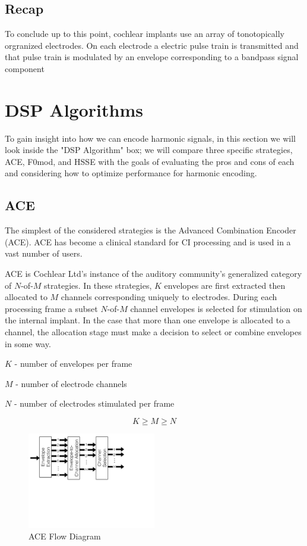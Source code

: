 \documentclass [11pt, proquest,oneside] {ganter_thesis}[2015/03/03]
\begin{document}
\subsection{Recap}

To conclude up to this point, cochlear implants use an array of tonotopically orgranized electrodes.  On each electrode a electric pulse train is transmitted and that pulse train is modulated by an envelope corresponding to a bandpass signal component

\section{DSP Algorithms}

To gain insight into how we can encode harmonic signals, in this section we will look inside the "DSP Algorithm" box; we will compare three specific strategies, ACE, F0mod, and HSSE with the goals of evaluating the pros and cons of each and considering how to optimize performance for harmonic encoding.

\subsection{ACE}\label{ss:ACE}

The simplest of the considered strategies is the Advanced Combination Encoder (ACE).  ACE has become a clinical standard for CI processing and is used in a vast number of users.

ACE is Cochlear Ltd's instance of the auditory community's generalized category of $N$-of-$M$ strategies.  In these strategies, $K$ envelopes are first extracted then allocated to $M$ channels corresponding uniquely to electrodes.  During each processing frame a subset $N$-of-$M$ channel envelopes is selected for stimulation on the internal implant.  In the case that more than one envelope is allocated to a channel, the allocation stage must make a decision to select or combine envelopes in some way.

$K$ - number of envelopes per frame

$M$ - number of electrode channels

$N$ - number of electrodes stimulated per frame

$$K \geq M \geq N$$

\begin{figure}[!ht]
  \centering
    \includegraphics[width=0.5\textwidth]{ACE_flow_diagram_explicit}   
    \caption{ACE Flow Diagram}
\end{figure}
\end{document}
